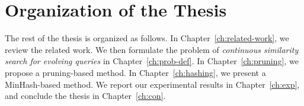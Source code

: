 \section{Organization of the Thesis}
The rest of the thesis is organized as follows. In Chapter~\ref{ch:related-work}, we review the related work. We then formulate the problem of \emph{continuous similarity search for evolving queries} in Chapter~\ref{ch:prob-def}. In Chapter~\ref{ch:pruning}, we propose a pruning-based method.  In Chapter~\ref{ch:hashing}, we present a MinHash-based method.  We report our experimental results in Chapter~\ref{ch:exp}, and conclude the thesis in Chapter~\ref{ch:con}.










